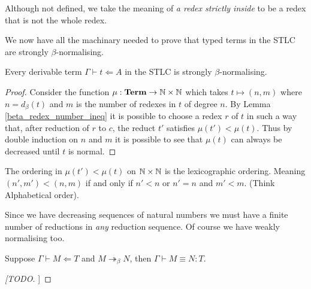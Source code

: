 \begin{remark}
    Although not defined, we take the meaning of \emph{a redex strictly inside} to be a redex that is not the whole redex.
\end{remark}

We now have all the machinary needed to prove that typed terms in the STLC are strongly $\beta$-normalising.

\begin{theorem}\label{beta_SN}
    Every derivable term $\Gamma \vdash t \Leftarrow A$ in the STLC is strongly $\beta$-normalising.
\end{theorem}

\begin{proof}
    Consider the function $\mu : \mathbf{Term} \to \mathbb{N} \times \mathbb{N}$ which takes $t \mapsto (n, m)$ where $n = d_{\beta}(t)$ and $m$ is the number of redexes in $t$ of degree $n$. By Lemma \ref{beta_redex_number_ineq} it is possible to choose a redex $r$ of $t$ in such a way that, after reduction of $r$ to $c$, the reduct $t'$ satisfies $\mu(t') < \mu(t)$. Thus by double induction on $n$ and $m$ it is possible to see that $\mu(t)$ can always be decreased until $t$ is normal.
\end{proof}

\begin{remark}
    The ordering in $\mu(t') < \mu(t)$ on $\mathbb{N} \times \mathbb{N} $ is the lexicographic ordering. Meaning $(n', m') < (n, m)$ if and only if $n' < n$ or $n'=n$ and $m' < m$. (Think Alphabetical order).
\end{remark}

\begin{remark}
    Since we have decreasing sequences of natural numbers we must have a finite number of reductions in \emph{any} reduction sequence. Of course we have weakly normalising too.
\end{remark}

\begin{lemma}
    Suppose $\Gamma \vdash M \Leftarrow T$ and $M \twoheadrightarrow_{\beta} N$, then $\Gamma \vdash M \equiv N : T$.
\end{lemma}

\begin{proof}
    [[TODO]]
\end{proof}
\begin{comment}
\begin{remark}
    Observe that by ($\equiv_{\mathsf{term}}$-tran) we can show this by induction on the definition $\twoheadrightarrow_{\beta}$. Thus it is sufficient to prove that given $\Gamma \vdash M \Leftarrow T$ and $M \to_{\beta} N$, then $\Gamma \vdash M \equiv N : T$.
\end{remark}

\begin{remark}
    This justifies our choice of rules, and shows that considering only terms strips away the typing information to no consequence.
\end{remark}
\end{comment}

